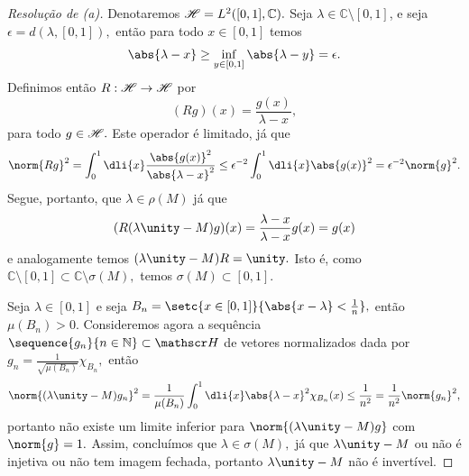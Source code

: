 \begin{proof}[Resolução de (a)]
  Denotaremos \(\mathscr{H} = L^2([0,1],\mathbb{C}).\) Seja \(\lambda \in \mathbb{C} \setminus [0,1]\), e seja \(\epsilon = d(\lambda, [0,1]),\) então para todo \(x \in [0,1]\) temos
  \begin{equation*}
    \abs{\lambda - x} \geq \inf_{y \in [0,1]}{\abs{\lambda - y}} = \epsilon.
  \end{equation*}
  Definimos então \(R : \mathscr{H} \to \mathscr{H}\) por
  \begin{equation*}
    (Rg)(x) = \frac{g(x)}{\lambda - x},
  \end{equation*}
  para todo \(g \in \mathscr{H}.\) Este operador é limitado, já que
  \begin{equation*}
    \norm{Rg}^2 = \int_0^1 \dli{x} \frac{\abs{g(x)}^2}{\abs{\lambda - x}^2} \leq \epsilon^{-2}\int_0^1 \dli{x} \abs{g(x)}^2 = \epsilon^{-2} \norm{g}^2.
  \end{equation*}
  Segue, portanto, que \(\lambda \in \rho(M)\) já que
  \begin{equation*}
    (R(\lambda \unity - M)g)(x) = \frac{\lambda - x}{\lambda - x}g(x) = g(x)
  \end{equation*}
  e analogamente temos \((\lambda \unity - M)R = \unity.\) Isto é, como \(\mathbb{C} \setminus [0,1] \subset \mathbb{C} \setminus \sigma(M),\) temos \(\sigma(M) \subset [0,1].\)

  Seja \(\lambda \in [0,1]\) e seja \(B_n = \setc{x \in [0,1]}{\abs{x - \lambda} < \frac1n},\) então \(\mu(B_n) > 0.\) Consideremos agora a sequência \(\sequence{g_n}{n \in\mathbb{N}}\subset \hilbert\) de vetores normalizados dada por \(g_n = \frac{1}{\sqrt{\mu(B_n)}}\chi_{B_n},\) então
  \begin{equation*}
    \norm{(\lambda \unity - M)g_n}^2 = \frac{1}{\mu(B_n)}\int_0^1 \dli{x} \abs{\lambda - x}^2\chi_{B_n}(x) \leq \frac{1}{n^2} = \frac{1}{n^2} \norm{g_n}^2,
  \end{equation*}
  portanto não existe um limite inferior para \(\norm{(\lambda \unity - M)g}\) com \(\norm{g} = 1.\) Assim, concluímos que \(\lambda \in \sigma(M),\) já que \(\lambda \unity - M\) ou não é injetiva ou não tem imagem fechada, portanto \(\lambda \unity - M\) não é invertível.
\end{proof}
